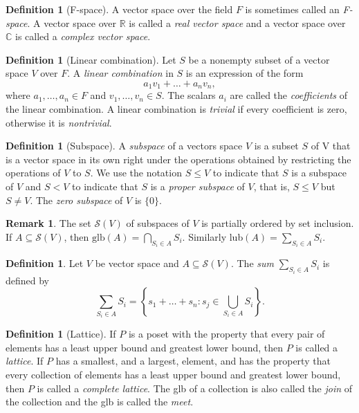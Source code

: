 \documentclass[12pt]{article}
\theoremstyle{definition}
\newtheorem{definition}[theorem]{Definition}
\newtheorem*{remark}{Remark}
\newcommand{\real}{\mathbb{R}}   %
\newcommand{\C}{\mathbb{C}}    %
\begin{document}
\begin{definition}[F-space]
    A vector space over the field $F$ is sometimes called an \textit{F-space}. A vector space over $\real$ is called a \textit{real vector space} and a vector space over $\C$ is called a \textit{complex vector space}.
\end{definition}
\newpage
\begin{definition}[Linear combination]
    Let $S$ be a nonempty subset of a vector space $V$ over $F$. A \textit{linear combination} in $S$ is an expression of the form
    \begin{equation*}
        a_1v_1+\dots+a_nv_n,
    \end{equation*}
    where $a_1,\dots, a_n\in F$ and $v_1,\dots, v_n\in S$. The scalars $a_i$ are called the \textit{coefficients} of the linear combination. A linear combination is \textit{trivial} if every coefficient is zero, otherwise it is \textit{nontrivial}.
\end{definition}
\begin{definition}[Subspace]
    A \textit{subspace} of a vectors space $V$ is a subset $S$ of V that is a vector space in its own right under the operations obtained by restricting the operations of $V$ to $S$. We use the notation $S\leq V$ to indicate that $S$ is a subspace of $V$ and $S<V$ to indicate that $S$ is a \textit{proper subspace} of $V$, that is, $S\leq V$ but $S\neq V$. The \textit{zero subspace} of $V$ is $\{0\}$.
\end{definition}
\begin{remark}
    The set $\mathcal{S}(V)$ of subspaces of $V$ is partially ordered by set inclusion. If $A\subseteq \mathcal{S}(V)$, then $\text{glb}(A)=\bigcap_{S_i\in A} S_i$. Similarly lub$(A)=\sum_{S_i\in A} S_i$.
\end{remark}
\begin{definition}
    Let $V$ be vector space and $A\subseteq\mathcal{S}(V)$. The \textit{sum} $\sum_{S_i\in A} S_i$ is defined by 
    \begin{equation*}
        \sum_{S_i\in A} S_i=\left\{s_1+\dots +s_n: s_j\in \bigcup_{S_i\in A} S_i\right\}.
    \end{equation*}
\end{definition}
\begin{definition}[Lattice]
    If $P$ is a poset with the property that every pair of elements has a least upper bound and greatest lower bound, then $P$ is called a \textit{lattice}. If $P$ has a smallest, and a largest, element, and has the property that every collection of elements has a least upper bound and greatest lower bound, then $P$ is called a \textit{complete lattice}. The glb of a collection is also called the \textit{join} of the collection and the glb is called the \textit{meet}.
\end{definition}
\end{document}
